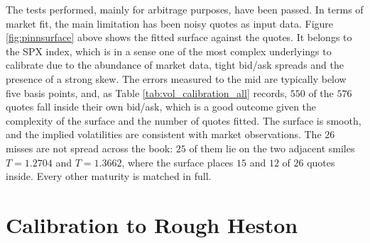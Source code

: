 The tests performed, mainly for arbitrage purposes, have been passed. In terms of market fit, the main limitation has been noisy quotes as input data. Figure \ref{fig:pinnsurface} above shows the fitted surface against the quotes. It belongs to the SPX index, which is in a sense one of the most complex underlyings to calibrate due to the abundance of market data, tight bid/ask spreads and the presence of a strong skew. The errors measured to the mid are typically below five basis points, and, as Table \ref{tab:vol_calibration_all} records, $550$ of the $576$ quotes fall inside their own bid/ask, which is a good outcome given the complexity of the surface and the number of quotes fitted. The surface is smooth, and the implied volatilities are consistent with market observations. The $26$ misses are not spread across the book: $25$ of them lie on the two adjacent smiles $T=1.2704$ and $T=1.3662$, where the surface places $15$ and $12$ of $26$ quotes inside. Every other maturity is matched in full.



\section{Calibration to Rough Heston}
\label{sec:roughcalib}

